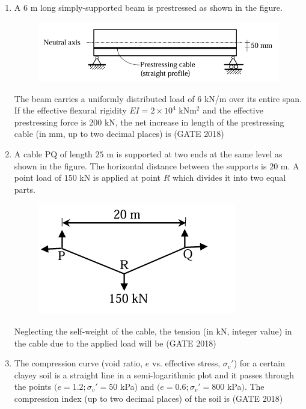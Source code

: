 \documentclass[journal,12pt,onecolumn]{IEEEtran}
\theoremstyle{remark}
\begin{document}
\begin{enumerate}
\item A $6$ m long simply-supported beam is prestressed as shown in the figure.
\begin{figure}[h]
    \centering
    \includegraphics[width=0.5\linewidth]{GATE-CE-2018/41-2.png}
    \caption{}
    \label{41-2}
\end{figure}
The beam carries a uniformly distributed load of $6$ kN/m over its entire span. If the effective flexural rigidity $EI=2\times10^4$ kNm$^2$ and the effective prestressing force is 200 kN, the net increase in length of the prestressing cable (in mm, up to two decimal places) is \underline{\hspace{3cm}}
\hfill{(GATE 2018)}
\vspace{1cm}

\item A cable PQ of length $25$ m is supported at two ends at the same level as shown in the figure. The horizontal distance between the supports is $20$ m. A point load of $150$ kN is applied at point $R$ which divides it into two equal parts.
\begin{figure}[h]
    \centering
    \includegraphics[width=0.5\linewidth]{GATE-CE-2018/42-2.png}
    \caption{}
    \label{42-2}
\end{figure}
Neglecting the self-weight of the cable, the tension (in kN, integer value) in the cable due to the applied load will be \underline{\hspace{3cm}}
\hfill{(GATE 2018)}
\vspace{1cm}

\item The compression curve (void ratio, $e$ vs. effective stress, $\sigma_v'$) for a certain clayey soil is a straight line in a semi-logarithmic plot and it passes through the points $(e=1.2; \sigma_v'=50$ kPa) and $(e=0.6; \sigma_v'=800$ kPa$)$. The compression index (up to two decimal places) of the soil is \underline{\hspace{3cm}}
\hfill{(GATE 2018)}
\vspace{1cm}


\end{enumerate}
\end{document}
